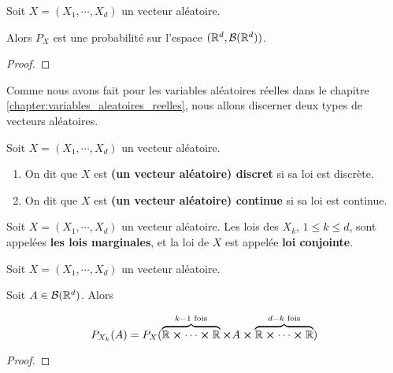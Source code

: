 \begin{proposition}
	Soit $X = (X_{1}, \cdots, X_{d})$ un vecteur aléatoire.

	Alors $P_{X}$ est une probabilité sur l'espace $(\mathbb{R}^{d},
	\mathcal{B}(\mathbb{R}^{d}))$.
\end{proposition}

\ifdefined\outputproof
\begin{proof}

\end{proof}
\fi

Comme nous avons fait pour les variables aléatoires réelles dans le chapitre
\ref{chapter:variables_aleatoires_reelles}, nous allons discerner deux
types de vecteurs aléatoires.

\begin{definition}
	Soit $X = (X_{1}, \cdots, X_{d})$ un vecteur aléatoire.

	\begin{enumerate}
		\item On dit que $X$ est \textbf{(un vecteur aléatoire) discret} si sa
			loi est discrète.
		\item On dit que $X$ est \textbf{(un vecteur aléatoire) continue} si sa
			loi est continue.
	\end{enumerate}
\end{definition}

\begin{definition}
	Soit $X = (X_{1}, \cdots, X_{d})$ un vecteur aléatoire.
	Les lois des $X_{k}$, $1 \leq k \leq d$, sont appelées \textbf{les lois
	marginales}, et la loi de $X$ est appelée \textbf{loi conjointe}.
\end{definition}

\begin{proposition}
	Soit $X = (X_{1}, \cdots, X_{d})$ un vecteur aléatoire.

	Soit $A \in \mathcal{B}(\mathbb{R}^{d})$.
	Alors

	\begin{equation}
		P_{X_{k}}(A) = P_{X}(\overbrace{\mathbb{R} \cross \cdots \cross \mathbb{R}}^{k - 1 \text{ fois}}
		\cross A \cross \overbrace{\mathbb{R} \cross \cdots \cross \mathbb{R}}^{d - k
			\text{ fois}})
	\end{equation}
\end{proposition}

\ifdefined\outputproof
\begin{proof}

\end{proof}
\fi

